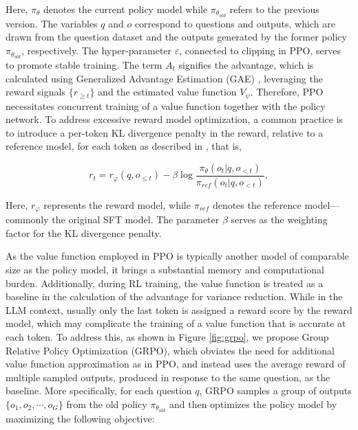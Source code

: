 \begin{itemize}[topsep=0pt]
\begin{itemize}[topsep=0pt]
Here, $\pi_{\theta}$ denotes the current policy model while $\pi_{\theta_{old}}$ refers to the previous version. The variables $q$ and $o$ correspond to questions and outputs, which are drawn from the question dataset and the outputs generated by the former policy $\pi_{\theta_{old}}$, respectively. The hyper-parameter $\varepsilon$, connected to clipping in PPO, serves to promote stable training. The term $A_t$ signifies the advantage, which is calculated using Generalized Advantage Estimation (GAE) \citep{gae}, leveraging the reward signals $\{r_{\ge t}\}$ and the estimated value function $V_{\psi}$. Therefore, PPO necessitates concurrent training of a value function together with the policy network. To address excessive reward model optimization, a common practice is to introduce a per-token KL divergence penalty in the reward, relative to a reference model, for each token as described in \citep{ouyang2022training}, that is,

\begin{equation}
    r_{t} = r_\varphi(q, o_{\le t}) - \beta \log\frac{\pi_{\theta}(o_{t}|q, o_{<t})}{\pi_{ref}(o_{t}|q, o_{<t})},
\label{eq:PPO-reward}
\end{equation}

Here, $r_\varphi$ represents the reward model, while $\pi_{ref}$ denotes the reference model—commonly the original SFT model. The parameter $\beta$ serves as the weighting factor for the KL divergence penalty.

As the value function employed in PPO is typically another model of comparable size as the policy model, it brings a substantial memory and computational burden. Additionally, during RL training, the value function is treated as a baseline in the calculation of the advantage for variance reduction. While in the LLM context, usually only the last token is assigned a reward score by the reward model, which may complicate the training of a value function that is accurate at each token. To address this, as shown in Figure \ref{fig:grpo}, we propose Group Relative Policy Optimization (GRPO), which obviates the need for additional value function approximation as in PPO, and instead uses the average reward of multiple sampled outputs, produced in response to the same question, as the baseline. More specifically, for each question $q$, GRPO samples a group of outputs $\{o_1, o_2, \cdots, o_G\}$  from the old policy  $\pi_{\theta_{old}}$  and then optimizes the policy model by maximizing the following objective:


\end{itemize}
\end{itemize}
